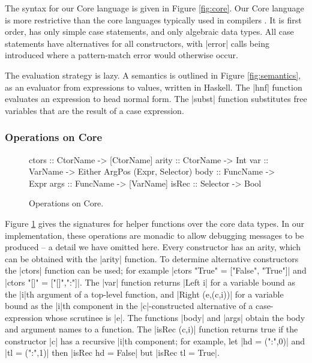 \documentclass[preprint]{sigplanconf}
\begin{document}
The syntax for our Core language is given in Figure \ref{fig:core}. Our Core language is more restrictive than the core languages typically used in compilers \cite{ghc_core}. It is first order, has only simple case statements, and only algebraic data types. All case statements have alternatives for all constructors, with |error| calls being introduced where a pattern-match error would otherwise occur.

The evaluation strategy is lazy. A semantics is outlined in Figure \ref{fig:semantics}, as an evaluator from expressions to values, written in Haskell. The |hnf| function evaluates an expression to head normal form. The |subst| function substitutes free variables that are the result of a case expression.

\subsubsection{Operations on Core}

\begin{figure}
\begin{code}
ctors        :: CtorName  -> [CtorName]
arity        :: CtorName  -> Int
var          :: VarName   -> Either ArgPos (Expr, Selector)
body         :: FuncName  -> Expr
args         :: FuncName  -> [VarName]
isRec        :: Selector  -> Bool
\end{code}
\caption{Operations on Core.}
\label{fig:core_operations}
\end{figure}

Figure \ref{fig:core_operations} gives the signatures for helper functions over the core data types. In our implementation, these operations are monadic to allow debugging messages to be produced -- a detail we have omitted here. Every constructor has an arity, which can be obtained with the |arity| function. To determine alternative constructors the |ctors| function can be used; for example |ctors "True" = ["False", "True"]| and |ctors "[]" = ["[]",":"]|. The |var| function returns |Left i| for a variable bound as the |i|th argument of a top-level function, and |Right (e,(c,i))| for a variable bound as the |i|th component in the |c|-constructed alternative of a case-expression whose scrutinee is |e|. The functions |body| and |args| obtain the body and argument names to a function. The |isRec (c,i)| function returns true if the constructor |c| has a recursive |i|th component; for example, let |hd = (":",0)| and |tl = (":",1)| then |isRec hd = False| but |isRec tl = True|.
\end{document}
